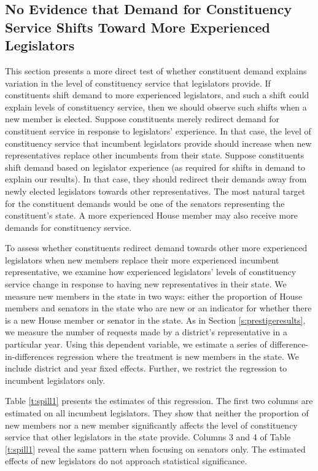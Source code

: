 \documentclass[12pt]{article}
\begin{document}
\subsection{No Evidence that Demand for Constituency Service Shifts Toward More Experienced Legislators}
This section presents a more direct test of whether constituent demand explains variation in the level of constituency service that legislators provide. If constituents shift demand to more experienced legislators, and such a shift could explain levels of constituency service, then we should observe such shifts when a new member is elected.  Suppose constituents merely redirect demand for constituent service in response to legislators' experience. In that case, the level of constituency service that incumbent legislators provide should increase when new representatives replace other incumbents from their state.  Suppose constituents shift demand based on legislator experience (as required for shifts in demand to explain our results). In that case, they should redirect their demands away from newly elected legislators towards other representatives. The most natural target for the constituent demands would be one of the senators representing the constituent's state. A more experienced House member may also receive more demands for constituency service.

To assess whether constituents redirect demand towards other more experienced legislators when new members replace their more experienced incumbent representative, we examine how experienced legislators' levels of constituency service change in response to having new representatives in their state. We measure new members in the state in two ways: either the proportion of House members and senators in the state who are new or an indicator for whether there is a new House member or senator in the state. As in Section \ref{s:prestigeresults}, we measure the number of requests made by a district's representative in a particular year. Using this dependent variable, we estimate a series of difference-in-differences regression where the treatment is new members in the state. We include district and year fixed effects. Further, we restrict the regression to incumbent legislators only.   

Table \ref{t:spill1} presents the estimates of this regression. The first two columns are estimated on all incumbent legislators. They show that neither the proportion of new members nor a new member significantly affects the level of constituency service that other legislators in the state provide. Columns 3 and 4 of Table \ref{t:spill1} reveal the same pattern when focusing on senators only. The estimated effects of new legislators do not approach statistical significance.  
\end{document}
